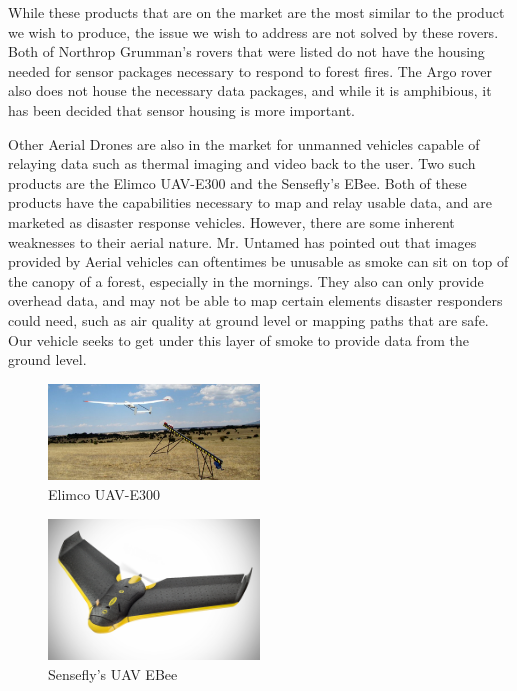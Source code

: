 While these products that are on the market are the most similar to the product we wish to produce, the issue we wish to address are not solved by these rovers. Both of Northrop Grumman's rovers that were listed do not have the housing needed for sensor packages necessary to respond to forest fires. The Argo rover also does not house the necessary data packages, and while it is amphibious, it has been decided that sensor housing is more important.

Other Aerial Drones are also in the market for unmanned vehicles capable of relaying data such as thermal imaging and video back to the user. Two such products are the Elimco UAV-E300 and the Sensefly's EBee. Both of these products have the capabilities necessary to map and relay usable data, and are marketed as disaster response vehicles. However, there are some inherent weaknesses to their aerial nature. Mr. Untamed has pointed out that images provided by Aerial vehicles can oftentimes be unusable as smoke can sit on top of the canopy of a forest, especially in the mornings. They also can only provide overhead data, and may not be able to map certain elements disaster responders could need, such as air quality at ground level or mapping paths that are safe. Our vehicle seeks to get under this layer of smoke to provide data from the ground level.

\begin{figure}[H]
\centering
\includegraphics[width=0.5\textwidth]{UAV-E300.jpg}
\caption{Elimco UAV-E300}
\label{fig:ElimcoUAVE300}
\end{figure}

\begin{figure}[H]
\centering
\includegraphics[width=0.5\textwidth]{e-bee.jpg}
\caption{Sensefly's UAV EBee}
\label{fig:SenseflyEBee}
\end{figure}
%

